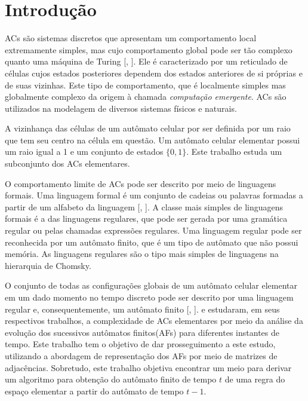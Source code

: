 \documentclass[12pt,a4paper]{article}
\begin{document}
\newpage
\thispagestyle{empty}
\tableofcontents

\newpage
\pagestyle{plain}
\renewcommand{\baselinestretch}{1.5} 
\normalsize

\newcommand{\citecustom}[1]{[\citeauthoronline{#1}, \citeyear{#1}]}

\section{Introdução}

ACs são sistemas discretos que apresentam um comportamento
local extremamente simples, mas cujo comportamento global pode ser tão
complexo quanto uma máquina de Turing \citecustom{wolfram1984a}. Ele
é caracterizado por um reticulado de células cujos estados posteriores
dependem dos estados anteriores de si próprias e de suas vizinhas.
Este tipo de comportamento, que é localmente simples mas globalmente
complexo da origem à chamada \textit{computação emergente}. 
ACs são utilizados na modelagem de diversos sistemas
físicos e naturais.

A vizinhança das células de um autômato celular por ser definida por
um raio que tem seu centro na célula em questão. Um autômato celular
elementar possui um raio igual a 1 e um conjunto de estados $\{0,1\}$.
Este trabalho estuda um subconjunto dos ACs elementares.

O comportamento limite de ACs pode ser descrito por meio
de linguagens formais. Uma linguagem formal é um conjunto de cadeias ou
palavras formadas a partir de um alfabeto da linguagem
\citecustom{lewis2008}. A classe mais simples de linguagens formais é
a das linguagens regulares, que pode ser gerada por uma gramática regular ou
pelas chamadas expressões regulares. Uma linguagem regular pode ser
reconhecida por um autômato finito, que é um tipo de autômato que
não possui memória. As linguagens regulares são o tipo mais simples
de linguagens na hierarquia de Chomsky.

O conjunto de todas as configurações globais de um autômato celular
elementar em um dado momento no tempo discreto pode ser descrito por
uma linguagem regular e, consequentemente, um autômato finito
\citecustom{wolfram1984}.  e 
estudaram, em seus respectivos trabalhos, a complexidade de ACs
elementares por meio da análise da evolução dos sucessivos
autômatos finitos(AFs) para diferentes instantes de tempo. Este trabalho
tem o objetivo de dar prosseguimento a este estudo, utilizando a abordagem
de representação dos AFs por meio de matrizes de adjacências.
Sobretudo, este trabalho objetiva encontrar um meio para derivar um
algoritmo para obtenção do autômato finito de tempo $t$ de uma regra
do espaço elementar a partir do autômato de tempo $t-1$.
\end{document}

